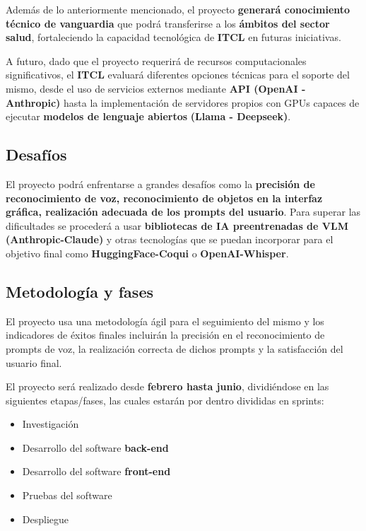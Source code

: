Además de lo anteriormente mencionado, el proyecto \textbf{generará conocimiento técnico de vanguardia} que podrá transferirse a los \textbf{ámbitos del sector salud}, fortaleciendo la capacidad tecnológica de \textbf{ITCL} en futuras iniciativas.

A futuro, dado que el proyecto requerirá de recursos computacionales significativos, el \textbf{ITCL} evaluará diferentes opciones técnicas para el soporte del mismo, desde el uso de servicios externos mediante \textbf{API (OpenAI - Anthropic)} hasta la implementación de servidores propios con GPUs capaces de ejecutar \textbf{modelos de lenguaje abiertos} \textbf{(Llama - Deepseek)}.

\newpage

\subsection{Desafíos}

El proyecto podrá enfrentarse a grandes desafíos como la \textbf{precisión de reconocimiento de voz, reconocimiento de objetos en la interfaz gráfica, realización adecuada de los prompts del usuario}. Para superar las dificultades se procederá a usar \textbf{bibliotecas de IA preentrenadas de VLM (Anthropic-Claude)} y otras tecnologías que se puedan incorporar para el objetivo final como \textbf{HuggingFace-Coqui}\cite{coquiXTTSv2} o \textbf{OpenAI-Whisper}\cite{openaiWhisperV3}.

\subsection{Metodología y fases}

El proyecto usa una metodología ágil para el seguimiento del mismo y los indicadores de éxitos finales incluirán la precisión en el reconocimiento de prompts de voz, la realización correcta de dichos prompts y la satisfacción del usuario final.

El proyecto será realizado desde \textbf{febrero hasta junio}, dividiéndose en las siguientes etapas/fases, las cuales estarán por dentro divididas en sprints:

\begin{itemize}
    \item Investigación
    \item Desarrollo del software \textbf{back-end}
    \item Desarrollo del software \textbf{front-end}
    \item Pruebas del software
    \item Despliegue
\end{itemize}
